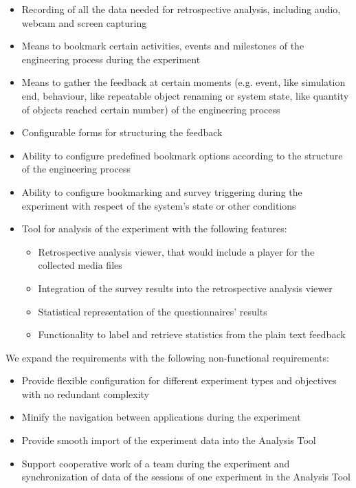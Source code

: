 \begin{itemize}
\item Recording of all the data needed for retrospective analysis, including audio, webcam and screen capturing
\item Means to bookmark certain activities, events and milestones of the engineering process during the experiment
\item Means to gather the feedback at certain moments (e.g. event, like simulation end, behaviour, like repeatable object renaming or system state, like quantity of objects reached certain number) of the engineering process
\item Configurable forms for structuring the feedback
\item Ability to configure predefined bookmark options according to the structure of the engineering process
\item Ability to configure bookmarking and survey triggering during the experiment with respect of the system's state or other conditions
\item Tool for analysis of the experiment with the following features:
\begin{itemize}
  \item Retrospective analysis viewer, that would include a player for the collected media files
   \item Integration of the survey results into the retrospective analysis viewer
  \item Statistical representation of the questionnaires' results
   \item Functionality to label and retrieve statistics from the plain text feedback
\end{itemize}

\end{itemize}

We expand the requirements with the following non-functional requirements:

\begin{itemize}
\item Provide flexible configuration for different experiment types and objectives with no redundant complexity
\item Minify the navigation between applications during the experiment
\item Provide smooth import of the experiment data into the Analysis Tool
\item Support cooperative work of a team during the experiment and synchronization of data of the sessions of one experiment in the Analysis Tool
\end{itemize}



